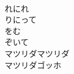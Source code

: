 \documentclass[10pt,b5j]{tarticle} %
\begin{document}
\begin{enumerate}
\begin{minipage}[c]{\blocksize}
        \vspace{\linespace}
        \item~\\
        れにれ\\
        りにって\\
        をむ\\
        ぞいて\\
        マツリダマツリダ\\
        マツリダゴッホ
    
    \end{minipage}
\end{enumerate} %
\end{document}
